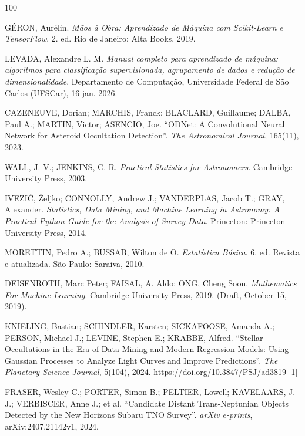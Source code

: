 \documentclass[msc]{on} %
\begin{document}
\begin{thebibliography}{100}

 G\'ERON, Aur\'elin. \textit{M\~aos \`a Obra: Aprendizado de M\'aquina com Scikit-Learn e TensorFlow}. 2. ed. Rio de Janeiro: Alta Books, 2019.

 LEVADA, Alexandre L. M. \textit{Manual completo para aprendizado de m\'aquina: algoritmos para classifica\c{c}\~ao supervisionada, agrupamento de dados e redu\c{c}\~ao de dimensionalidade}. Departamento de Computa\c{c}\~ao, Universidade Federal de S\~ao Carlos (UFSCar), 16 jan. 2026.

 CAZENEUVE, Dorian; MARCHIS, Franck; BLACLARD, Guillaume; DALBA, Paul A.; MARTIN, Victor; ASENCIO, Joe. ``ODNet: A Convolutional Neural Network for Asteroid Occultation Detection''. \emph{The Astronomical Journal}, 165(11), 2023.

 WALL, J. V.; JENKINS, C. R. \textit{Practical Statistics for Astronomers}. Cambridge University Press, 2003.

 IVEZI\'C, \v{Z}eljko; CONNOLLY, Andrew J.; VANDERPLAS, Jacob T.; GRAY, Alexander. \textit{Statistics, Data Mining, and Machine Learning in Astronomy: A Practical Python Guide for the Analysis of Survey Data}. Princeton: Princeton University Press, 2014.

 MORETTIN, Pedro A.; BUSSAB, Wilton de O. \textit{Estatística Básica}. 6. ed. Revista e atualizada. São Paulo: Saraiva, 2010.

 DEISENROTH, Marc Peter; FAISAL, A. Aldo; ONG, Cheng Soon. \textit{Mathematics For Machine Learning}. Cambridge University Press, 2019. (Draft, October 15, 2019).

 KNIELING, Bastian; SCHINDLER, Karsten; SICKAFOOSE, Amanda A.; PERSON, Michael J.; LEVINE, Stephen E.; KRABBE, Alfred. ``Stellar Occultations in the Era of Data Mining and Modern Regression Models: Using Gaussian Processes to Analyze Light Curves and Improve Predictions''. \emph{The Planetary Science Journal}, 5(104), 2024. \url{https://doi.org/10.3847/PSJ/ad3819} [1]

 FRASER, Wesley C.; PORTER, Simon B.; PELTIER, Lowell; KAVELAARS, J. J.; VERBISCER, Anne J.; et al. ``Candidate Distant Trans-Neptunian Objects Detected by the New Horizons Subaru TNO Survey''. \emph{arXiv e-prints}, arXiv:2407.21142v1, 2024.


\end{thebibliography}
\end{document}
